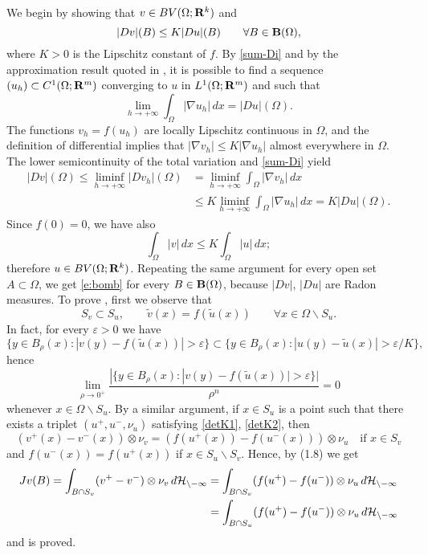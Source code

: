 \begin{pf}
 We begin by showing that $v\in BV(\Omega;\bold R^k)$ and
\begin{equation}\label{e:bomb}
|Dv|(B)\le K|Du|(B)\qquad\forall B\in\bold B(\Omega ),\end{equation}
where $K>0$ is the Lipschitz constant of $f$. By \eqref{sum-Di}
and by the approximation
result quoted in ,
it is possible to find a sequence $(u_h)\subset C^1(\Omega ;\bold R^m)$
converging to $u$ in $L^1(\Omega ;\bold R^m)$ and such that
\[\lim_{h\to +\infty}\int_\Omega |\nabla u_h|\,dx=|Du|(\Omega ).\]
The functions $v_h=f(u_h)$ are locally Lipschitz continuous in $\Omega $,
and the definition of differential implies that $|\nabla v_h|\le K|\nabla
u_h|$ almost everywhere in $\Omega $. The lower semicontinuity of the total
variation and \eqref{sum-Di} yield
\begin{equation}
\begin{split}
|Dv|(\Omega )\le\liminf_{h\to +\infty}|Dv_h|(\Omega) &
=\liminf_{h\to +\infty}\int_\Omega |\nabla v_h|\,dx\\
&\le K\liminf_{h\to +\infty}\int_\Omega
|\nabla u_h|\,dx=K|Du|(\Omega).
\end{split}\end{equation}
Since $f(0)=0$, we have also
\[\int_\Omega |v|\,dx\le K\int_\Omega |u|\,dx;\]
therefore $u\in BV(\Omega ;\bold R^k)$. Repeating the same argument for
every open set $A\subset\Omega $, we get \eqref{e:bomb}
for every $B\in\bold B(\Omega)$,
because $|Dv|$, $|Du|$ are Radon measures. To prove ,
first we observe that
\begin{equation}\label{e:SS}
S_v\subset S_u,\qquad\tilde v(x)=f(\tilde u(x))\qquad \forall x\in\Omega
\backslash S_u.\end{equation}
In fact, for every $\varepsilon >0$ we have
\[\{y\in B_\rho(x): |v(y)-f(\tilde u(x))|>\varepsilon \}\subset \{y\in
B_\rho(x): |u(y)-\tilde u(x)|>\varepsilon /K\},\]
hence
\[\lim_{\rho\to 0^+}\frac{|\{y\in B_\rho(x): |v(y)-f(\tilde u(x))|>
\varepsilon \}|}{\rho^n}=0\]
whenever $x\in\Omega \backslash S_u$.
By a similar argument, if $x\in S_u$ is a point such that there exists
a triplet $(u^+,u^-,\nu_u)$ satisfying \eqref{detK1}, \eqref{detK2}, then
\[
(v^+(x)-v^-(x))\otimes \nu_v=(f(u^+(x))-f(u^-(x)))\otimes\nu_u\quad
\text{if }x\in S_v
\]
and $f(u^-(x))=f(u^+(x))$ if $x\in S_u\backslash S_v$. Hence, by (1.8) we get
\begin{equation*}\begin{split}
Jv(B)=\int_{B\cap S_v}(v^+-v^-)\otimes \nu_v\,d\cal H_{n-1}&=
\int_{B\cap S_v}(f(u^+)-f(u^-))\otimes \nu_u\,d\cal H_{n-1}\\
&=\int_{B\cap S_u}(f(u^+)-f(u^-))\otimes \nu_u\,d\cal H_{n-1}
\end{split}\end{equation*}
and  is proved.
\end{pf}

